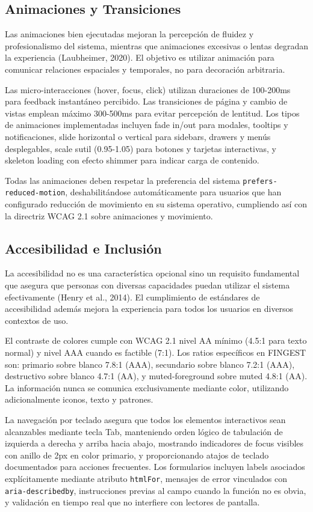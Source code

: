 \documentclass[12pt,a4paper,oneside]{article}
\begin{document}
\subsection{Animaciones y Transiciones}

Las animaciones bien ejecutadas mejoran la percepción de fluidez y profesionalismo del sistema, mientras que animaciones excesivas o lentas degradan la experiencia (Laubheimer, 2020). El objetivo es utilizar animación para comunicar relaciones espaciales y temporales, no para decoración arbitraria.

Las micro-interacciones (hover, focus, click) utilizan duraciones de 100-200ms para feedback instantáneo percibido. Las transiciones de página y cambio de vistas emplean máximo 300-500ms para evitar percepción de lentitud. Los tipos de animaciones implementadas incluyen fade in/out para modales, tooltips y notificaciones, slide horizontal o vertical para sidebars, drawers y menús desplegables, scale sutil (0.95-1.05) para botones y tarjetas interactivas, y skeleton loading con efecto shimmer para indicar carga de contenido.

Todas las animaciones deben respetar la preferencia del sistema \texttt{prefers-reduced-motion}, deshabilitándose automáticamente para usuarios que han configurado reducción de movimiento en su sistema operativo, cumpliendo así con la directriz WCAG 2.1 sobre animaciones y movimiento.

\subsection{Accesibilidad e Inclusión}

La accesibilidad no es una característica opcional sino un requisito fundamental que asegura que personas con diversas capacidades puedan utilizar el sistema efectivamente (Henry et al., 2014). El cumplimiento de estándares de accesibilidad además mejora la experiencia para todos los usuarios en diversos contextos de uso.

El contraste de colores cumple con WCAG 2.1 nivel AA mínimo (4.5:1 para texto normal) y nivel AAA cuando es factible (7:1). Los ratios específicos en FINGEST son: primario sobre blanco 7.8:1 (AAA), secundario sobre blanco 7.2:1 (AAA), destructivo sobre blanco 4.7:1 (AA), y muted-foreground sobre muted 4.8:1 (AA). La información nunca se comunica exclusivamente mediante color, utilizando adicionalmente iconos, texto y patrones.

La navegación por teclado asegura que todos los elementos interactivos sean alcanzables mediante tecla Tab, manteniendo orden lógico de tabulación de izquierda a derecha y arriba hacia abajo, mostrando indicadores de focus visibles con anillo de 2px en color primario, y proporcionando atajos de teclado documentados para acciones frecuentes. Los formularios incluyen labels asociados explícitamente mediante atributo \texttt{htmlFor}, mensajes de error vinculados con \texttt{aria-describedby}, instrucciones previas al campo cuando la función no es obvia, y validación en tiempo real que no interfiere con lectores de pantalla.
\end{document}
